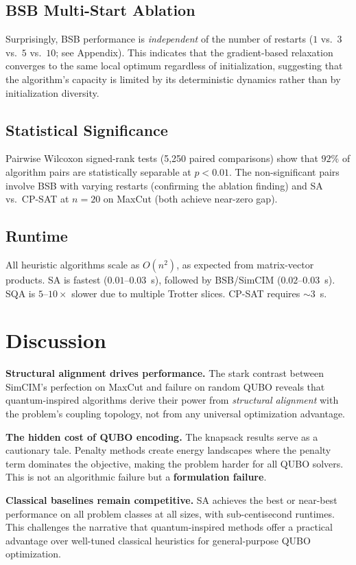 \documentclass[10pt,twocolumn]{article}
\begin{document}
\subsection{BSB Multi-Start Ablation}
Surprisingly, BSB performance is \emph{independent} of the number of restarts ($1$ vs.\ $3$ vs.\ $5$ vs.\ $10$; see Appendix). This indicates that the gradient-based relaxation converges to the same local optimum regardless of initialization, suggesting that the algorithm's capacity is limited by its deterministic dynamics rather than by initialization diversity.

\subsection{Statistical Significance}
Pairwise Wilcoxon signed-rank tests (5,250 paired comparisons) show that $92\%$ of algorithm pairs are statistically separable at $p<0.01$. The non-significant pairs involve BSB with varying restarts (confirming the ablation finding) and SA vs.\ CP-SAT at $n=20$ on MaxCut (both achieve near-zero gap).

\subsection{Runtime}
All heuristic algorithms scale as $O(n^2)$, as expected from matrix-vector products. SA is fastest ($0.01$--$0.03$~s), followed by BSB/SimCIM ($0.02$--$0.03$~s). SQA is $5$--$10\times$ slower due to multiple Trotter slices. CP-SAT requires $\sim3$~s.

\section{Discussion}
\label{sec:discussion}

\textbf{Structural alignment drives performance.} The stark contrast between SimCIM's perfection on MaxCut and failure on random QUBO reveals that quantum-inspired algorithms derive their power from \emph{structural alignment} with the problem's coupling topology, not from any universal optimization advantage.

\textbf{The hidden cost of QUBO encoding.} The knapsack results serve as a cautionary tale. Penalty methods create energy landscapes where the penalty term dominates the objective, making the problem harder for all QUBO solvers. This is not an algorithmic failure but a \textbf{formulation failure}.

\textbf{Classical baselines remain competitive.} SA achieves the best or near-best performance on all problem classes at all sizes, with sub-centisecond runtimes. This challenges the narrative that quantum-inspired methods offer a practical advantage over well-tuned classical heuristics for general-purpose QUBO optimization.
\end{document}
